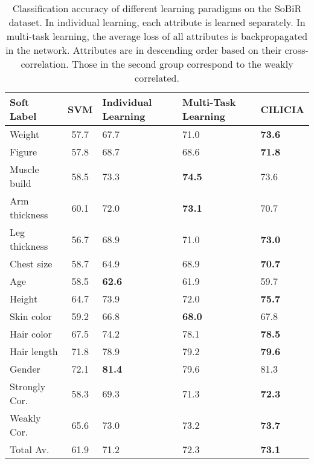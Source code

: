 \documentclass[10pt,twocolumn,letterpaper]{article}
\begin{document}
	\begin{table}[t]
		\centering
		\caption{Classification accuracy of different learning paradigms on the SoBiR dataset. In individual learning, each attribute is learned separately. In multi-task learning, the average loss of all attributes is backpropagated in the network. Attributes are in descending order based on their cross-correlation. Those in the second group correspond to the weakly correlated.}
		\small    
		\begin{tabular}{l c P{1.2cm} P{1.4cm} P{1.2cm}}
			\toprule
			Soft Label  & SVM & Individual Learning & Multi-Task Learning & CILICIA\\
			\midrule
			Weight & 57.7 & 67.7 & 71.0 & \textbf{73.6} \\
			Figure &  57.8 & 68.7 & 68.6 & \textbf{71.8}  \\
			Muscle build & 58.5 & 73.3 & \textbf{74.5} & 73.6 \\
			Arm thickness & 60.1 & 72.0 & \textbf{73.1} & 70.7 \\
			Leg thickness & 56.7 & 68.9 & 71.0 & \textbf{73.0} \\
			Chest size &  58.7 & 64.9 & 68.9 & \textbf{70.7} \\
			\midrule
			Age &  58.5 & \textbf{62.6} & 61.9 & 59.7 \\
			Height &  64.7 & 73.9 & 72.0 & \textbf{75.7} \\            
			Skin color & 59.2 & 66.8 & \textbf{68.0} & 67.8 \\
			Hair color &  67.5 & 74.2 & 78.1 & \textbf{78.5} \\
			Hair length & 71.8 & 78.9 & 79.2 & \textbf{79.6} \\
			Gender & 72.1 & \textbf{81.4} & 79.6 & 81.3 \\
			\midrule
			Strongly Cor.& 58.3 & 69.3 & 71.3 & \textbf{72.3} \\
			Weakly Cor.& 65.6 & 73.0 & 73.2 & \textbf{73.7} \\
			Total Av. &  61.9 & 71.2 & 72.3 & \textbf{73.1}\\
			\bottomrule
		\end{tabular}%
		\label{tab:SoBiR}%
	\end{table}%
\end{document}
